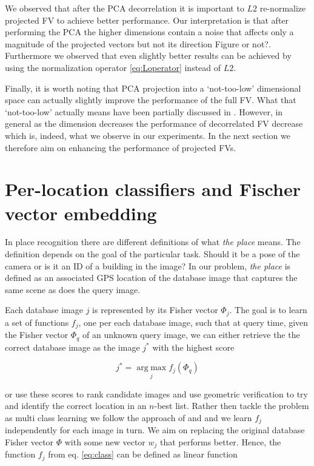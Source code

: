 \documentclass[table]{article} %
\begin{document}
			We observed that after the PCA decorrelation it is important to $L2$ re-normalize projected FV to achieve better performance. Our interpretation is that after performing the PCA the higher dimensions contain a noise that affects only a magnitude of the projected vectors but not its direction \textcolor{myRed}{Figure or not?}. Furthermore we observed that even slightly better results can be achieved by using the normalization operator \eqref{eq:Loperator} instead of $L2$.

			Finally, it is worth noting that PCA projection into a `not-too-low' dimensional space can actually slightly improve the performance of the full FV. What that `not-too-low' actually means have been partially discussed in \cite{Jegou2012HAL}. However, in general as the dimension decreases the performance of decorrelated FV decrease which is, indeed, what we observe in our experiments. In the next section we therefore aim on enhancing the performance of projected FVs.   


\section{Per-location classifiers and Fischer vector embedding}
\label{sec:perLoc}
	In place recognition there are different definitions of what \emph{the place} means. The definition depends on the goal of the particular task. Should it be a pose of the camera or is it an ID of a building in the image? In our problem, \emph{the place} is defined as an associated GPS location of the database image that captures the same scene as does the query image. 

	Each database image $j$ is represented by its Fisher vector $\Phi_j$. The goal is to learn a set of functions $f_j$, one per each database image, such that at query time, given the Fisher vector $\Phi_q$ of an unknown query image, we can either retrieve the the correct database image as the image $j^*$ with the highest score

   \begin{equation}
	   \label{eq:class}
	    j^*=\operatorname*{arg\;max}_{j} f_j(\Phi_q) 
   \end{equation}

   \noindent
    or use these scores to rank candidate images and use geometric verification to try and identify the correct location in an $n$-best list. Rather then tackle the problem as multi class learning we follow the approach of \cite{Malisiewicz11} and \cite{Gronat2013} and we learn $f_j$ independently for each image in turn. We aim on replacing the original database Fisher vector $\Phi$ with some new vector $w_j$ that performs better. Hence, the function $f_j$ from eq. \eqref{eq:class} can be defined as linear function
\end{document}
